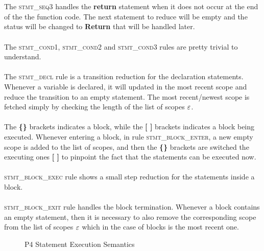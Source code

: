 \documentclass[UTF8]{article}
\begin{document}
\\~\\
The \textsc{stmt\_seq3} handles the \textbf{return} statement when it does not occur at the end of the the function code. The next statement to reduce will be empty and the status will be changed to \textbf{Return} that will be handled later.
\\~\\
The \textsc{stmt\_cond1}, \textsc{stmt\_cond2} and \textsc{stmt\_cond3} rules are pretty trivial to understand.
\\~\\
The \textsc{stmt\_decl} rule is a transition reduction for the declaration statements. Whenever a variable is declared, it will updated in the most recent scope and reduce the transition to an empty statement. The most recent/newest scope is fetched simply by checking the length of the list of scopes $\varepsilon$. 
\\~\\
The \textbf{\{\}} brackets indicates a block, while the \textbf{[ ]} brackets indicates a block being executed.
Whenever entering a block, in rule \textsc{stmt\_block\_enter}, a new empty scope is added to the list of scopes, and then the \textbf{\{\}} brackets are switched the executing ones \textbf{[ ]} to pinpoint the fact that the statements can be executed now.
\\~\\
\textsc{stmt\_block\_exec} rule shows a small step reduction for the statements inside a block.
\\~\\
\textsc{stmt\_block\_exit} rule handles the block termination. Whenever a block contains an empty statement, then it is necessary to also remove the corresponding scope from the list of scopes $\varepsilon$ which in the case of blocks is the most recent one.


\begin{figure}[ht!]
\ottdefnsstmtXXsem
\caption{P4 Statement Execution Semantics}
\label{fig:semstmtexec}
\end{figure}

\newcommand{\start}{\textit{start}}
\end{document}
